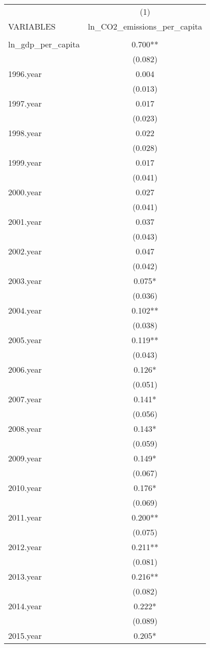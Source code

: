 \begin{tabular}{lc} \hline
 & (1) \\
VARIABLES & ln\_CO2\_emissions\_per\_capita \\ \hline
 &  \\
ln\_gdp\_per\_capita & 0.700** \\
 & (0.082) \\
1996.year & 0.004 \\
 & (0.013) \\
1997.year & 0.017 \\
 & (0.023) \\
1998.year & 0.022 \\
 & (0.028) \\
1999.year & 0.017 \\
 & (0.041) \\
2000.year & 0.027 \\
 & (0.041) \\
2001.year & 0.037 \\
 & (0.043) \\
2002.year & 0.047 \\
 & (0.042) \\
2003.year & 0.075* \\
 & (0.036) \\
2004.year & 0.102** \\
 & (0.038) \\
2005.year & 0.119** \\
 & (0.043) \\
2006.year & 0.126* \\
 & (0.051) \\
2007.year & 0.141* \\
 & (0.056) \\
2008.year & 0.143* \\
 & (0.059) \\
2009.year & 0.149* \\
 & (0.067) \\
2010.year & 0.176* \\
 & (0.069) \\
2011.year & 0.200** \\
 & (0.075) \\
2012.year & 0.211** \\
 & (0.081) \\
2013.year & 0.216** \\
 & (0.082) \\
2014.year & 0.222* \\
 & (0.089) \\
2015.year & 0.205* \\

\end{tabular}
